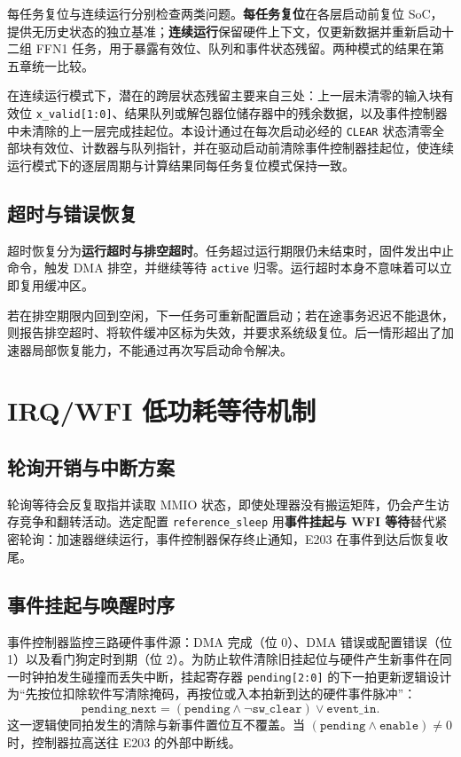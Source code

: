 \documentclass[UTF8,a4paper,zihao=-4,fontset=none,openany,oneside]{ctexrep}
\newcommand{\Q}{\texttt{reference\_\allowbreak{}sleep}}
\begin{document}
每任务复位与连续运行分别检查两类问题。\textbf{每任务复位}在各层启动前复位 SoC，提供无历史状态的独立基准；\textbf{连续运行}保留硬件上下文，仅更新数据并重新启动十二组 FFN1 任务，用于暴露有效位、队列和事件状态残留。两种模式的结果在第五章统一比较。

在连续运行模式下，潜在的跨层状态残留主要来自三处：上一层未清零的输入块有效位 \texttt{x\_valid[1:0]}、结果队列或解包器位储存器中的残余数据，以及事件控制器中未清除的上一层完成挂起位。本设计通过在每次启动必经的 \texttt{CLEAR} 状态清零全部块有效位、计数器与队列指针，并在驱动启动前清除事件控制器挂起位，使连续运行模式下的逐层周期与计算结果同每任务复位模式保持一致。

\subsection{超时与错误恢复}

超时恢复分为\textbf{运行超时与排空超时}。任务超过运行期限仍未结束时，固件发出中止命令，触发 DMA 排空，并继续等待 \texttt{active} 归零。运行超时本身不意味着可以立即复用缓冲区。

若在排空期限内回到空闲，下一任务可重新配置启动；若在途事务迟迟不能退休，则报告排空超时、将软件缓冲区标为失效，并要求系统级复位。后一情形超出了加速器局部恢复能力，不能通过再次写启动命令解决。

\section{IRQ/\allowbreak{}WFI 低功耗等待机制}\label{sec:base-irq-wfi}

\subsection{轮询开销与中断方案}

轮询等待会反复取指并读取 MMIO 状态，即使处理器没有搬运矩阵，仍会产生访存竞争和翻转活动。选定配置 \Q{} 用\textbf{事件挂起与 WFI 等待}替代紧密轮询：加速器继续运行，事件控制器保存终止通知，E203 在事件到达后恢复收尾。

\subsection{事件挂起与唤醒时序}

事件控制器监控三路硬件事件源：DMA 完成（位 0）、DMA 错误或配置错误（位 1）以及看门狗定时到期（位 2）。为防止软件清除旧挂起位与硬件产生新事件在同一时钟拍发生碰撞而丢失中断，挂起寄存器 \texttt{pending[2:0]} 的下一拍更新逻辑设计为“先按位扣除软件写清除掩码，再按位或入本拍新到达的硬件事件脉冲”：
\[
\texttt{pending\_next} = (\texttt{pending} \land \neg\texttt{sw\_clear}) \lor \texttt{event\_in}.
\]
这一逻辑使同拍发生的清除与新事件置位互不覆盖。当 $(\texttt{pending} \land \texttt{enable}) \neq 0$ 时，控制器拉高送往 E203 的外部中断线。
\end{document}

